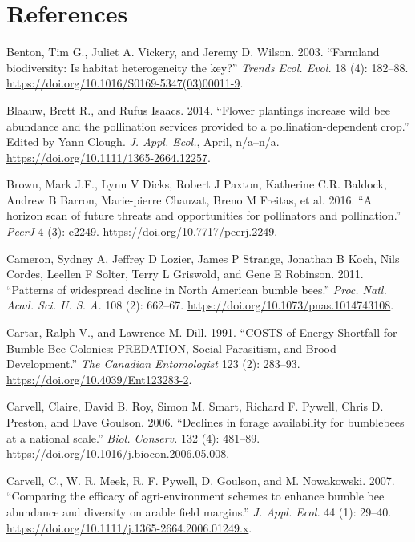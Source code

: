 \documentclass[11pt,]{article}
\begin{document}
\newpage

\hypertarget{references}{%
\section*{References}\label{references}}

\hypertarget{refs}{}
\leavevmode\hypertarget{ref-Benton2003}{}%
Benton, Tim G., Juliet A. Vickery, and Jeremy D. Wilson. 2003.
``Farmland biodiversity: Is habitat heterogeneity the key?''
\emph{Trends Ecol. Evol.} 18 (4): 182--88.
\url{https://doi.org/10.1016/S0169-5347(03)00011-9}.

\leavevmode\hypertarget{ref-Blaauw2014}{}%
Blaauw, Brett R., and Rufus Isaacs. 2014. ``Flower plantings increase
wild bee abundance and the pollination services provided to a
pollination-dependent crop.'' Edited by Yann Clough. \emph{J. Appl.
Ecol.}, April, n/a--n/a. \url{https://doi.org/10.1111/1365-2664.12257}.

\leavevmode\hypertarget{ref-Brown2016a}{}%
Brown, Mark J.F., Lynn V Dicks, Robert J Paxton, Katherine C.R. Baldock,
Andrew B Barron, Marie-pierre Chauzat, Breno M Freitas, et al. 2016. ``A
horizon scan of future threats and opportunities for pollinators and
pollination.'' \emph{PeerJ} 4 (3): e2249.
\url{https://doi.org/10.7717/peerj.2249}.

\leavevmode\hypertarget{ref-Cameron2011}{}%
Cameron, Sydney A, Jeffrey D Lozier, James P Strange, Jonathan B Koch,
Nils Cordes, Leellen F Solter, Terry L Griswold, and Gene E Robinson.
2011. ``Patterns of widespread decline in North American bumble bees.''
\emph{Proc. Natl. Acad. Sci. U. S. A.} 108 (2): 662--67.
\url{https://doi.org/10.1073/pnas.1014743108}.

\leavevmode\hypertarget{ref-Cartar1991}{}%
Cartar, Ralph V., and Lawrence M. Dill. 1991. ``COSTS of Energy
Shortfall for Bumble Bee Colonies: PREDATION, Social Parasitism, and
Brood Development.'' \emph{The Canadian Entomologist} 123 (2): 283--93.
\url{https://doi.org/10.4039/Ent123283-2}.

\leavevmode\hypertarget{ref-Carvell2006b}{}%
Carvell, Claire, David B. Roy, Simon M. Smart, Richard F. Pywell, Chris
D. Preston, and Dave Goulson. 2006. ``Declines in forage availability
for bumblebees at a national scale.'' \emph{Biol. Conserv.} 132 (4):
481--89. \url{https://doi.org/10.1016/j.biocon.2006.05.008}.

\leavevmode\hypertarget{ref-Carvell2007}{}%
Carvell, C., W. R. Meek, R. F. Pywell, D. Goulson, and M. Nowakowski.
2007. ``Comparing the efficacy of agri-environment schemes to enhance
bumble bee abundance and diversity on arable field margins.'' \emph{J.
Appl. Ecol.} 44 (1): 29--40.
\url{https://doi.org/10.1111/j.1365-2664.2006.01249.x}.
\end{document}
